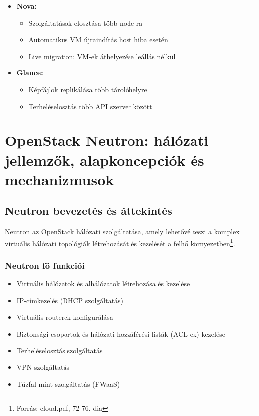 \documentclass[a4paper,12pt]{article}
\begin{document}
    \begin{itemize}
        \item \textbf{Nova:}
        \begin{itemize}
            \item Szolgáltatások elosztása több node-ra
            \item Automatikus VM újraindítás host hiba esetén
            \item Live migration: VM-ek áthelyezése leállás nélkül
        \end{itemize}

        \item \textbf{Glance:}
        \begin{itemize}
            \item Képfájlok replikálása több tárolóhelyre
            \item Terheléselosztás több API szerver között
        \end{itemize}
    \end{itemize}

    \newpage


    \section{OpenStack Neutron: hálózati jellemzők, alapkoncepciók és mechanizmusok}

    \subsection{Neutron bevezetés és áttekintés}

    Neutron az OpenStack hálózati szolgáltatása, amely lehetővé teszi a komplex virtuális hálózati topológiák létrehozását és kezelését a felhő környezetben\footnote{Forrás: cloud.pdf, 72-76. dia}.

    \subsubsection{Neutron fő funkciói}

    \begin{itemize}
        \item Virtuális hálózatok és alhálózatok létrehozása és kezelése
        \item IP-címkezelés (DHCP szolgáltatás)
        \item Virtuális routerek konfigurálása
        \item Biztonsági csoportok és hálózati hozzáférési listák (ACL-ek) kezelése
        \item Terheléselosztás szolgáltatás
        \item VPN szolgáltatás
        \item Tűzfal mint szolgáltatás (FWaaS)
    \end{itemize}
\end{document}
